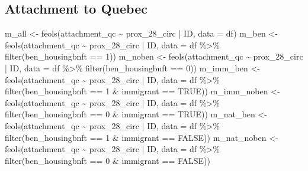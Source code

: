 \documentclass[
  letterpaper,
  DIV=11,
  numbers=noendperiod]{scrartcl}
\newenvironment{Shaded}{\begin{snugshade}}{\end{snugshade}}
\newcommand{\AttributeTok}[1]{\textcolor[rgb]{0.40,0.45,0.13}{#1}}
\newcommand{\ConstantTok}[1]{\textcolor[rgb]{0.56,0.35,0.01}{#1}}
\newcommand{\DecValTok}[1]{\textcolor[rgb]{0.68,0.00,0.00}{#1}}
\newcommand{\FunctionTok}[1]{\textcolor[rgb]{0.28,0.35,0.67}{#1}}
\newcommand{\NormalTok}[1]{\textcolor[rgb]{0.00,0.23,0.31}{#1}}
\newcommand{\OtherTok}[1]{\textcolor[rgb]{0.00,0.23,0.31}{#1}}
\newcommand{\SpecialCharTok}[1]{\textcolor[rgb]{0.37,0.37,0.37}{#1}}
\begin{document}
\hypertarget{attachment-to-quebec}{%
\subsection{Attachment to Quebec}\label{attachment-to-quebec}}

\begin{Shaded}
\begin{Highlighting}[]
\NormalTok{m\_all }\OtherTok{\textless{}{-}} \FunctionTok{feols}\NormalTok{(attachment\_qc }\SpecialCharTok{\textasciitilde{}}\NormalTok{ prox\_28\_circ }\SpecialCharTok{|}\NormalTok{ ID, }\AttributeTok{data =}\NormalTok{ df)}
\NormalTok{m\_ben }\OtherTok{\textless{}{-}} \FunctionTok{feols}\NormalTok{(attachment\_qc }\SpecialCharTok{\textasciitilde{}}\NormalTok{ prox\_28\_circ }\SpecialCharTok{|}\NormalTok{ ID,}
               \AttributeTok{data =}\NormalTok{ df }\SpecialCharTok{\%\textgreater{}\%} \FunctionTok{filter}\NormalTok{(ben\_housingbnft }\SpecialCharTok{==} \DecValTok{1}\NormalTok{))}
\NormalTok{m\_noben }\OtherTok{\textless{}{-}} \FunctionTok{feols}\NormalTok{(attachment\_qc }\SpecialCharTok{\textasciitilde{}}\NormalTok{ prox\_28\_circ }\SpecialCharTok{|}\NormalTok{ ID,}
                 \AttributeTok{data =}\NormalTok{ df }\SpecialCharTok{\%\textgreater{}\%} \FunctionTok{filter}\NormalTok{(ben\_housingbnft }\SpecialCharTok{==} \DecValTok{0}\NormalTok{))}
\NormalTok{m\_imm\_ben }\OtherTok{\textless{}{-}} \FunctionTok{feols}\NormalTok{(attachment\_qc }\SpecialCharTok{\textasciitilde{}}\NormalTok{ prox\_28\_circ }\SpecialCharTok{|}\NormalTok{ ID,}
                   \AttributeTok{data =}\NormalTok{ df }\SpecialCharTok{\%\textgreater{}\%} \FunctionTok{filter}\NormalTok{(ben\_housingbnft }\SpecialCharTok{==} \DecValTok{1} \SpecialCharTok{\&}\NormalTok{ immigrant }\SpecialCharTok{==} \ConstantTok{TRUE}\NormalTok{))}
\NormalTok{m\_imm\_noben }\OtherTok{\textless{}{-}} \FunctionTok{feols}\NormalTok{(attachment\_qc }\SpecialCharTok{\textasciitilde{}}\NormalTok{ prox\_28\_circ }\SpecialCharTok{|}\NormalTok{ ID,}
                     \AttributeTok{data =}\NormalTok{ df }\SpecialCharTok{\%\textgreater{}\%} \FunctionTok{filter}\NormalTok{(ben\_housingbnft }\SpecialCharTok{==} \DecValTok{0} \SpecialCharTok{\&}\NormalTok{ immigrant }\SpecialCharTok{==} \ConstantTok{TRUE}\NormalTok{))}
\NormalTok{m\_nat\_ben }\OtherTok{\textless{}{-}} \FunctionTok{feols}\NormalTok{(attachment\_qc }\SpecialCharTok{\textasciitilde{}}\NormalTok{ prox\_28\_circ }\SpecialCharTok{|}\NormalTok{ ID,}
                   \AttributeTok{data =}\NormalTok{ df }\SpecialCharTok{\%\textgreater{}\%} \FunctionTok{filter}\NormalTok{(ben\_housingbnft }\SpecialCharTok{==} \DecValTok{1} \SpecialCharTok{\&}\NormalTok{ immigrant }\SpecialCharTok{==} \ConstantTok{FALSE}\NormalTok{))}
\NormalTok{m\_nat\_noben }\OtherTok{\textless{}{-}} \FunctionTok{feols}\NormalTok{(attachment\_qc }\SpecialCharTok{\textasciitilde{}}\NormalTok{ prox\_28\_circ }\SpecialCharTok{|}\NormalTok{ ID,}
                     \AttributeTok{data =}\NormalTok{ df }\SpecialCharTok{\%\textgreater{}\%} \FunctionTok{filter}\NormalTok{(ben\_housingbnft }\SpecialCharTok{==} \DecValTok{0} \SpecialCharTok{\&}\NormalTok{ immigrant }\SpecialCharTok{==} \ConstantTok{FALSE}\NormalTok{))}


\end{Highlighting}
\end{Shaded}
\end{document}

